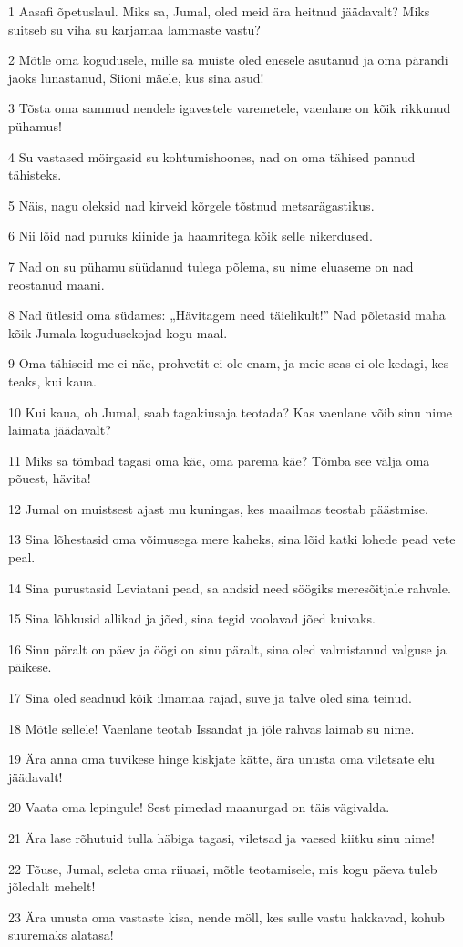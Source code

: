 \par 1 Aasafi õpetuslaul. Miks sa, Jumal, oled meid ära heitnud jäädavalt? Miks suitseb su viha su karjamaa lammaste vastu?
\par 2 Mõtle oma kogudusele, mille sa muiste oled enesele asutanud ja oma pärandi jaoks lunastanud, Siioni mäele, kus sina asud!
\par 3 Tõsta oma sammud nendele igavestele varemetele, vaenlane on kõik rikkunud pühamus!
\par 4 Su vastased möirgasid su kohtumishoones, nad on oma tähised pannud tähisteks.
\par 5 Näis, nagu oleksid nad kirveid kõrgele tõstnud metsarägastikus.
\par 6 Nii lõid nad puruks kiinide ja haamritega kõik selle nikerdused.
\par 7 Nad on su pühamu süüdanud tulega põlema, su nime eluaseme on nad reostanud maani.
\par 8 Nad ütlesid oma südames: „Hävitagem need täielikult!” Nad põletasid maha kõik Jumala kogudusekojad kogu maal.
\par 9 Oma tähiseid me ei näe, prohvetit ei ole enam, ja meie seas ei ole kedagi, kes teaks, kui kaua.
\par 10 Kui kaua, oh Jumal, saab tagakiusaja teotada? Kas vaenlane võib sinu nime laimata jäädavalt?
\par 11 Miks sa tõmbad tagasi oma käe, oma parema käe? Tõmba see välja oma põuest, hävita!
\par 12 Jumal on muistsest ajast mu kuningas, kes maailmas teostab päästmise.
\par 13 Sina lõhestasid oma võimusega mere kaheks, sina lõid katki lohede pead vete peal.
\par 14 Sina purustasid Leviatani pead, sa andsid need söögiks meresõitjale rahvale.
\par 15 Sina lõhkusid allikad ja jõed, sina tegid voolavad jõed kuivaks.
\par 16 Sinu päralt on päev ja öögi on sinu päralt, sina oled valmistanud valguse ja päikese.
\par 17 Sina oled seadnud kõik ilmamaa rajad, suve ja talve oled sina teinud.
\par 18 Mõtle sellele! Vaenlane teotab Issandat ja jõle rahvas laimab su nime.
\par 19 Ära anna oma tuvikese hinge kiskjate kätte, ära unusta oma viletsate elu jäädavalt!
\par 20 Vaata oma lepingule! Sest pimedad maanurgad on täis vägivalda.
\par 21 Ära lase rõhutuid tulla häbiga tagasi, viletsad ja vaesed kiitku sinu nime!
\par 22 Tõuse, Jumal, seleta oma riiuasi, mõtle teotamisele, mis kogu päeva tuleb jõledalt mehelt!
\par 23 Ära unusta oma vastaste kisa, nende möll, kes sulle vastu hakkavad, kohub suuremaks alatasa!

